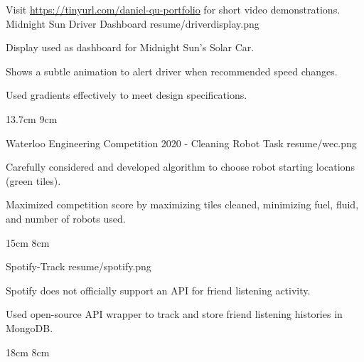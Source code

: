 

\begin{cventries}

  Visit \href{https://docs.google.com/document/d/e/2PACX-1vS0EqgEdK7blzAP3eqhoXZXuYXNIMIreo-fD56--8hDs616NmmvpaythZmCKw7Pt4CDEAfRSdoIxmMB/pub}{https://tinyurl.com/daniel-qu-portfolio} for short video demonstrations.
  \\%
  \portfolioEntry
    {Midnight Sun Driver Dashboard} %
    {resume/driverdisplay.png} %
    {
      \begin{cvitems} %
        \item {Display used as dashboard for Midnight Sun's Solar Car.}
        \item {Shows a subtle animation to alert driver when recommended speed changes.}
        \item {Used gradients effectively to meet design specifications.}
      \end{cvitems}
    }
    {13.7cm}
    {9cm}

  \portfolioEntry
    {Waterloo Engineering Competition 2020 - Cleaning Robot Task} %
    {resume/wec.png} %
    {
      \begin{cvitems} %
        \item {Carefully considered and developed algorithm to choose robot starting locations (green tiles).}
        \item {Maximized competition score by maximizing tiles cleaned, minimizing fuel, fluid, and number of robots used.}
      \end{cvitems}
    }
    {15cm}
    {8cm}
  
  \newpage

  \portfolioEntry
    {Spotify-Track} %
    {resume/spotify.png} %
    {
      \begin{cvitems} %
        \item {Spotify does not officially support an API for friend listening activity.}
        \item {Used open-source API wrapper to track and store friend listening histories in MongoDB.}
      \end{cvitems}
    }
    {18cm}
    {8cm}

\end{cventries}
